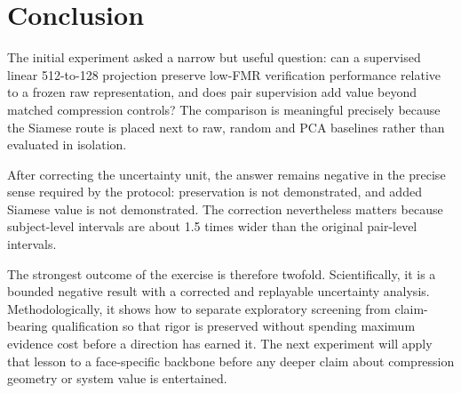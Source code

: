 \documentclass[10pt,a4paper]{article}
\begin{document}
\section{Conclusion}

The initial experiment asked a narrow but useful question: can a supervised linear
512-to-128 projection preserve low-FMR verification performance relative to a frozen raw
representation, and does pair supervision add value beyond matched compression controls?
The comparison is meaningful precisely because the Siamese route is placed next to raw,
random and PCA baselines rather than evaluated in isolation.

After correcting the uncertainty unit, the answer remains negative in the precise sense
required by the protocol: preservation is not demonstrated, and added Siamese value is not
demonstrated. The correction nevertheless matters because subject-level intervals are about
1.5 times wider than the original pair-level intervals.

The strongest outcome of the exercise is therefore twofold. Scientifically, it is a bounded
negative result with a corrected and replayable uncertainty analysis. Methodologically, it
shows how to separate exploratory screening from claim-bearing qualification so that rigor
is preserved without spending maximum evidence cost before a direction has earned it. The
next experiment will apply that lesson to a face-specific backbone before any deeper claim
about compression geometry or system value is entertained.
\end{document}
